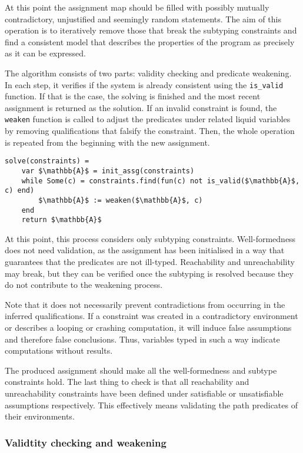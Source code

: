 At this point the assignment map should be filled with possibly mutually
contradictory, unjustified and seemingly random statements. The aim of this
operation is to iteratively remove those that break the subtyping constraints
and find a consistent model that describes the properties of the program as
precisely as it can be expressed.

The algorithm consists of two parts: validity checking and predicate weakening.
In each step, it verifies if the system is already consistent using the
\texttt{is\_valid} function. If that is the case, the solving is finished and
the most recent assignment is returned as the solution. If an invalid constraint
is found, the \texttt{weaken} function is called to adjust the predicates under
related liquid variables by removing qualifications that falsify the constraint.
Then, the whole operation is repeated from the beginning with the new
assignment.

\begin{lstlisting}[language=pseudocode]
solve(constraints) =
    var $\mathbb{A}$ = init_assg(constraints)
    while Some(c) = constraints.find(fun(c) not is_valid($\mathbb{A}$, c) end)
        $\mathbb{A}$ := weaken($\mathbb{A}$, c)
    end
    return $\mathbb{A}$
\end{lstlisting}

At this point, this process considers only subtyping constraints.
Well-formedness does not need validation, as the assignment has been initialised
in a way that guarantees that the predicates are not ill-typed. Reachability and
unreachability may break, but they can be verified once the subtyping is
resolved because they do not contribute to the weakening process.

Note that it does not necessarily prevent contradictions from occurring in the
inferred qualifications. If a constraint was created in a contradictory
environment or describes a looping or crashing computation, it will induce false
assumptions and therefore false conclusions. Thus, variables typed in such a way
indicate computations without results.

The produced assignment should make all the well-formedness and subtype
constraints hold. The last thing to check is that all reachability and
unreachability constraints have been defined under satisfiable or unsatisfiable
assumptions respectively. This effectively means validating the path predicates
of their environments.

\subsubsection{Validtity checking and weakening}

